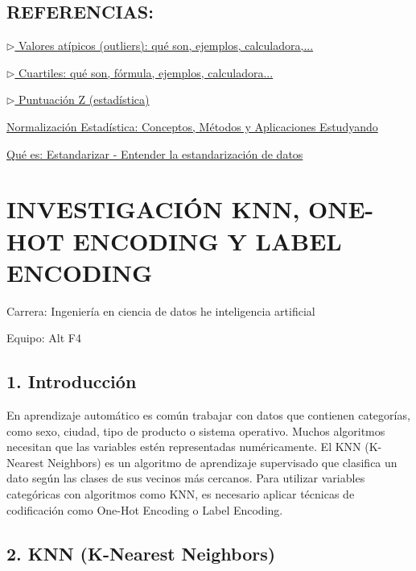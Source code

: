 \documentclass[]{article}
\begin{document}
\subsection{REFERENCIAS:}\label{referencias}

\href{https://www.probabilidadyestadistica.net/valores-atipicos-outliers/}{$\triangleright$
Valores atípicos (outliers): qué son, ejemplos, calculadora,...}

\href{https://www.probabilidadyestadistica.net/cuartiles/}{$\triangleright$ Cuartiles:
qué son, fórmula, ejemplos, calculadora...}

\href{https://www.probabilidadyestadistica.net/puntuacion-z/}{$\triangleright$
Puntuación Z (estadística)}

\href{https://estudyando.com/normalizacion-estadistica-conceptos-metodos-y-aplicaciones/}{Normalización
Estadística: Conceptos, Métodos y Aplicaciones \textbar{} Estudyando}

\href{https://es.statisticseasily.com/glosario/\%C2\%BFQu\%C3\%A9-es-la-estandarizaci\%C3\%B3n-de-datos\%3F/}{Qué
es: Estandarizar - Entender la estandarización de datos}

\section{INVESTIGACIÓN KNN, ONE-HOT ENCODING Y LABEL
ENCODING}\label{investigaciuxf3n-knn-one-hot-encoding-y-label-encoding}

Carrera: Ingeniería en ciencia de datos he inteligencia artificial

Equipo: Alt F4

\subsection{1. Introducción}\label{introducciuxf3n}

En aprendizaje automático es común trabajar con datos que contienen
categorías, como sexo, ciudad, tipo de producto o sistema operativo.
Muchos algoritmos necesitan que las variables estén representadas
numéricamente. El KNN (K-Nearest Neighbors) es un algoritmo de
aprendizaje supervisado que clasifica un dato según las clases de sus
vecinos más cercanos. Para utilizar variables categóricas con algoritmos
como KNN, es necesario aplicar técnicas de codificación como One-Hot
Encoding o Label Encoding.

\subsection{2. KNN (K-Nearest Neighbors)}\label{knn-k-nearest-neighbors}
\end{document}
